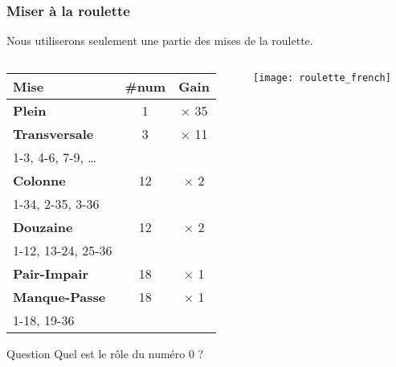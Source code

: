 \documentclass[10pt]{beamer}
\begin{document}
\begin{frame}
  \frametitle{Miser à la roulette}
  Nous utiliserons seulement une partie des mises de la roulette.
  
  \begin{columns}[c]
    \begin{column}{0.53\textwidth}
      \begin{tabular}{lcc}
        \toprule
        \textbf{Mise}         & \textbf{\#num} & \textbf{Gain} \\
        \midrule
        \textbf{Plein}        & 1                  & $\times$ 35   \\
        \textbf{Transversale} & 3                  & $\times$ 11   \\
        1-3, 4-6, 7-9, \dots                                      \\
        \textbf{Colonne}      & 12                 & $\times$ 2    \\
        1-34, 2-35, 3-36                                           \\
        \textbf{Douzaine}     & 12                 & $\times$ 2    \\
        1-12, 13-24, 25-36                                         \\
        \textbf{Pair-Impair}  & 18                 & $\times$ 1    \\
        \textbf{Manque-Passe} & 18                 & $\times$ 1    \\
        1-18, 19-36                                                \\
        \bottomrule
      \end{tabular}
      \begin{block}{Question}
        Quel est le rôle du numéro 0 ?
      \end{block}
    \end{column}
    \begin{column}{0.47\textwidth}
      \texttt{[image: roulette\_french]}
    \end{column}
  \end{columns}

\end{frame}
\end{document}
